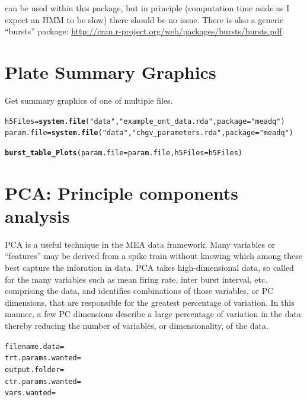 \documentclass{article}\usepackage[]{graphicx}\usepackage[]{color}
\makeatletter
\newcommand{\hlstr}[1]{\textcolor[rgb]{0.192,0.494,0.8}{#1}}%
\newcommand{\hlstd}[1]{\textcolor[rgb]{0.345,0.345,0.345}{#1}}%
\newcommand{\hlkwb}[1]{\textcolor[rgb]{0.69,0.353,0.396}{#1}}%
\newcommand{\hlkwc}[1]{\textcolor[rgb]{0.333,0.667,0.333}{#1}}%
\newcommand{\hlkwd}[1]{\textcolor[rgb]{0.737,0.353,0.396}{\textbf{#1}}}%
\newenvironment{kframe}{%
 \def\at@end@of@kframe{}%
 \ifinner\ifhmode%
  \def\at@end@of@kframe{\end{minipage}}%
  \begin{minipage}{\columnwidth}%
 \fi\fi%
 \def\FrameCommand##1{\hskip\@totalleftmargin \hskip-\fboxsep
 \colorbox{shadecolor}{##1}\hskip-\fboxsep
     \hskip-\linewidth \hskip-\@totalleftmargin \hskip\columnwidth}%
 \MakeFramed {\advance\hsize-\width
   \@totalleftmargin\z@ \linewidth\hsize
   \@setminipage}}%
 {\par\unskip\endMakeFramed%
 \at@end@of@kframe}
\newenvironment{knitrout}{}{} %
\makeatother
\begin{document}
can be used within this package, but in principle (computation time
aside as I expect an HMM to be slow) there should be no issue.  There
is also a generic ``bursts'' package:
\url{http://cran.r-project.org/web/packages/bursts/bursts.pdf}.



\section*{Plate Summary Graphics}

Get summary graphics of one of multiple files.

\begin{knitrout}
\color{fgcolor}\begin{kframe}
\begin{alltt}
\hlstd{h5Files} \hlkwb{=} \hlkwd{system.file}\hlstd{(}\hlstr{"data"}\hlstd{,} \hlstr{"example_ont_data.rda"}\hlstd{,} \hlkwc{package} \hlstd{=} \hlstr{"meadq"}\hlstd{)}
\hlstd{param.file} \hlkwb{=} \hlkwd{system.file}\hlstd{(}\hlstr{"data"}\hlstd{,} \hlstr{"chgv_parameters.rda"}\hlstd{,} \hlkwc{package} \hlstd{=} \hlstr{"meadq"}\hlstd{)}

\hlkwd{burst_table_Plots}\hlstd{(}\hlkwc{param.file} \hlstd{= param.file,} \hlkwc{h5Files} \hlstd{= h5Files)}
\end{alltt}
\end{kframe}
\end{knitrout}






\section*{PCA: Principle components analysis}

PCA is a useful technique in the MEA data framework. Many variables or ``features'' may be derived from a spike train without knowing which among these best capture the inforation in data.  PCA takes high-dimensional data, so called for the many variables such as mean firing rate, inter burst interval, etc. comprising the data, and identifies combinations of those variables, or PC dimensions, that are responsible for the greatest percentage of variation.  In this manner, a few PC dimensions describe a large percentage of variation in the data thereby reducing the number of variables, or dimensionality, of the data.

\begin{knitrout}
\color{fgcolor}\begin{kframe}
\begin{alltt}
filename.data = 
trt.params.wanted = 
output.folder = 
ctr.params.wanted = 
vars.wanted = 

\end{alltt}
\end{kframe}
\end{knitrout}
\end{document}
